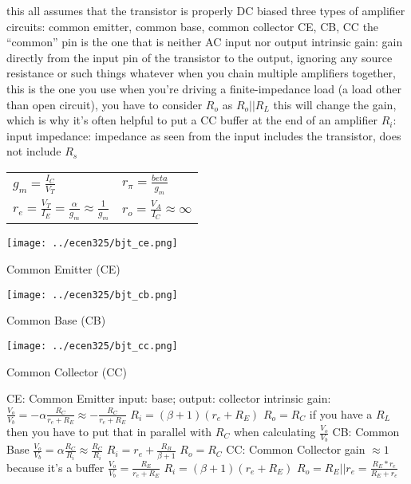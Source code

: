 \documentclass[12pt]{article}
\begin{document}
\begin{spacing}{0.8}
\begin{multicols*}{2}
\begin{flushleft}
\begin{outline}[longenum]
  \1 this all assumes that the transistor is properly DC biased
  \1 three types of amplifier circuits: common emitter, common base, common collector
    \2 CE, CB, CC
    \2 the ``common'' pin is the one that is neither AC input nor output
  \1 intrinsic gain: gain directly from the input pin of the transistor to the output, ignoring any source resistance or such things whatever
    \2 when you chain multiple amplifiers together, this is the one you use
  \1 when you're driving a finite-impedance load (a load other than open circuit), you have to consider $R_o$ as $R_o||R_L$
    \2 this will change the gain, which is why it's often helpful to put a CC buffer at the end of an amplifier
  \1 $R_i$: input impedance: impedance as seen from the input
    \2 includes the transistor, does not include $R_s$
  \1
  \begin{tabular}{l|l}
  $g_m = \frac{I_C}{V_T}$ & $r_\pi = \frac{beta}{g_m}$ \\
  $r_e = \frac{V_T}{I_E} = \frac{\alpha}{g_m} \approx \frac{1}{g_m}$
  & $r_o = \frac{V_A}{I_C} \approx \infty$ \\
  \end{tabular}
\0
\begin{minipage}{0.3\columnwidth}
  \texttt{[image: ../ecen325/bjt\_ce.png]}
\begin{center}
\vspace{-20px}
{\footnotesize Common Emitter (CE) }
\end{center}
\end{minipage}
\begin{minipage}{0.3\columnwidth}
\texttt{[image: ../ecen325/bjt\_cb.png]}
\begin{center}
{\footnotesize Common Base (CB) }
\end{center}
\end{minipage}
\begin{minipage}{0.3\columnwidth}
\texttt{[image: ../ecen325/bjt\_cc.png]}
\begin{center}
{\footnotesize Common Collector (CC) }
\end{center}
\end{minipage}
  \1 CE: Common Emitter
    \2 input: base; output: collector
    \2 intrinsic gain: $\frac{V_o}{V_b}= -\alpha\frac{R_C}{r_e + R_E} \approx -\frac{R_C}{r_e + R_E}$
    \2 $R_i=(\beta+1)(r_e+R_E)$
    \2 $R_o = R_C$
    \2 if you have a $R_L$ then you have to put that in parallel with $R_C$ when calculating $\frac{V_o}{V_b}$
  \1 CB: Common Base
    \2 $\frac{V_o}{V_b} = \alpha\frac{R_C}{R_i} \approx \frac{R_C}{R_i}$
    \2 $R_i = r_e + \frac{R_B}{\beta+1}$
    \2 $R_o=R_C$
  \1 CC: Common Collector
    \2 gain $\approx 1$ because it's a buffer
    \2 $\frac{V_o}{V_b} = \frac{R_E}{r_e+R_E}$
    \2 $R_i = (\beta+1)(r_e+R_E)$
    \2 $R_o = R_E||r_e = \frac{R_E*r_e}{R_E+r_e}$




\end{outline}
\end{flushleft}
\end{multicols*}
\end{spacing}
\end{document}
